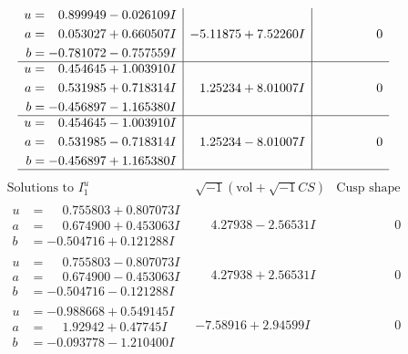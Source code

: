 \documentclass[1p]{elsarticle_modified}
\theoremstyle{definition}
\newcommand{\I}{\sqrt{-1}}
\begin{document}
$$\begin{array}{c|c|c}
\begin{aligned}
u &= \phantom{-}0.899949 - 0.026109 I \\
a &= \phantom{-}0.053027 + 0.660507 I \\
b &= -0.781072 - 0.757559 I\end{aligned}
 & -5.11875 + 7.52260 I & \phantom{-0.000000 } 0 \\ \hline\begin{aligned}
u &= \phantom{-}0.454645 + 1.003910 I \\
a &= \phantom{-}0.531985 + 0.718314 I \\
b &= -0.456897 - 1.165380 I\end{aligned}
 & \phantom{-}1.25234 + 8.01007 I & \phantom{-0.000000 } 0 \\ \hline\begin{aligned}
u &= \phantom{-}0.454645 - 1.003910 I \\
a &= \phantom{-}0.531985 - 0.718314 I \\
b &= -0.456897 + 1.165380 I\end{aligned}
 & \phantom{-}1.25234 - 8.01007 I & \phantom{-0.000000 } 0\\
 \hline 
 \end{array}$$\newpage$$\begin{array}{c|c|c}  
\text{Solutions to }I^u_{1}& \I (\text{vol} + \sqrt{-1}CS) & \text{Cusp shape}\\
 \hline 
\begin{aligned}
u &= \phantom{-}0.755803 + 0.807073 I \\
a &= \phantom{-}0.674900 + 0.453063 I \\
b &= -0.504716 + 0.121288 I\end{aligned}
 & \phantom{-}4.27938 - 2.56531 I & \phantom{-0.000000 } 0 \\ \hline\begin{aligned}
u &= \phantom{-}0.755803 - 0.807073 I \\
a &= \phantom{-}0.674900 - 0.453063 I \\
b &= -0.504716 - 0.121288 I\end{aligned}
 & \phantom{-}4.27938 + 2.56531 I & \phantom{-0.000000 } 0 \\ \hline\begin{aligned}
u &= -0.988668 + 0.549145 I \\
a &= \phantom{-}1.92942 + 0.47745 I \\
b &= -0.093778 - 1.210400 I\end{aligned}
 & -7.58916 + 2.94599 I & \phantom{-0.000000 } 0 \\ \hline\begin{aligned}

\end{aligned}
\end{array}$$
\end{document}
